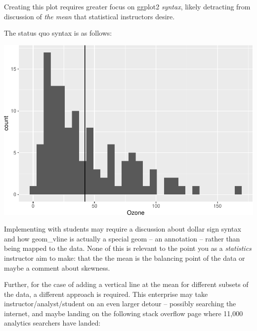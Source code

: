 \documentclass[12pt]{article}
\newenvironment{Shaded}{\begin{snugshade}}{\end{snugshade}}
\newcommand{\DataTypeTok}[1]{\textcolor[rgb]{0.13,0.29,0.53}{#1}}
\newcommand{\KeywordTok}[1]{\textcolor[rgb]{0.13,0.29,0.53}{\textbf{#1}}}
\newcommand{\NormalTok}[1]{#1}
\newcommand{\OperatorTok}[1]{\textcolor[rgb]{0.81,0.36,0.00}{\textbf{#1}}}
\newcommand{\StringTok}[1]{\textcolor[rgb]{0.31,0.60,0.02}{#1}}
\begin{document}
Creating this plot requires greater focus on ggplot2 \emph{syntax},
likely detracting from discussion of \emph{the mean} that statistical
instructors desire.

The status quo syntax is as follows:

\begin{Shaded}
\end{Shaded}

\begin{center}\includegraphics[width=0.5\linewidth]{manuscript_files/figure-latex/unnamed-chunk-3-1} \end{center}

Implementing with students may require a discussion about dollar sign
syntax and how geom\_vline is actually a special geom -- an annotation
-- rather than being mapped to the data. None of this is relevant to the
point you as a \emph{statistics} instructor aim to make: that the the
mean is the balancing point of the data or maybe a comment about
skewness.

Further, for the case of adding a vertical line at the mean for
different subsets of the data, a different approach is required. This
enterprise may take instructor/analyst/student on an even larger detour
-- possibly searching the internet, and maybe landing on the following
stack overflow page where 11,000 analytics searchers have landed:
\end{document}
